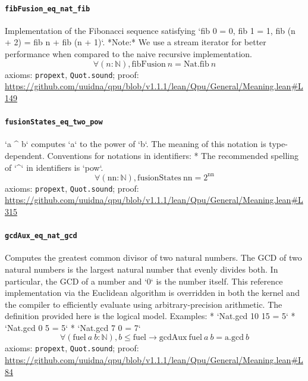 \documentclass[11pt]{article}
\begin{document}
\paragraph{\texttt{fibFusion\_eq\_nat\_fib}}
Implementation of the Fibonacci sequence satisfying `fib 0 = 0, fib 1 = 1, fib (n + 2) = fib n + fib (n + 1)`.  *Note:* We use a stream iterator for better performance when compared to the naive recursive implementation.
\[ \forall (n : \mathbb{N}), \mathrm{fibFusion}\ n = \mathrm{Nat.fib}\ n \]
\noindent axioms: \texttt{propext}, \texttt{Quot.sound}; proof: \url{https://github.com/uuidna/qpu/blob/v1.1.1/lean/Qpu/General/Meaning.lean\#L149}

\paragraph{\texttt{fusionStates\_eq\_two\_pow}}
`a \^{} b` computes `a` to the power of `b`. The meaning of this notation is type-dependent.   Conventions for notations in identifiers:   * The recommended spelling of `\^{}` in identifiers is `pow`.
\[ \forall (\mathrm{nn} : \mathbb{N}), \mathrm{fusionStates}\ \mathrm{nn} = 2 ^{\mathrm{nn}} \]
\noindent axioms: \texttt{propext}, \texttt{Quot.sound}; proof: \url{https://github.com/uuidna/qpu/blob/v1.1.1/lean/Qpu/General/Meaning.lean\#L315}

\paragraph{\texttt{gcdAux\_eq\_nat\_gcd}}
Computes the greatest common divisor of two natural numbers. The GCD of two natural numbers is the largest natural number that evenly divides both.  In particular, the GCD of a number and `0` is the number itself.  This reference implementation via the Euclidean algorithm is overridden in both the kernel and the compiler to efficiently evaluate using arbitrary-precision arithmetic. The definition provided here is the logical model.  Examples: * `Nat.gcd 10 15 = 5` * `Nat.gcd 0 5 = 5` * `Nat.gcd 7 0 = 7`
\[ \forall (\mathrm{fuel}\ a\ b : \mathbb{N}), b \le \mathrm{fuel} \to \mathrm{gcdAux}\ \mathrm{fuel}\ a\ b = \mathrm{a.gcd}\ b \]
\noindent axioms: \texttt{propext}, \texttt{Quot.sound}; proof: \url{https://github.com/uuidna/qpu/blob/v1.1.1/lean/Qpu/General/Meaning.lean\#L84}
\end{document}
